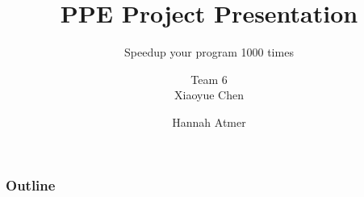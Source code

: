 \documentclass{beamer}
\title{PPE Project Presentation}
\subtitle{Speedup your program 1000 times}
\author{Team 6 \\Xiaoyue Chen \and Hannah Atmer}
\begin{document}
\begin{frame}
  \titlepage
\end{frame}

\begin{frame}
  \frametitle{Outline}
  \tableofcontents
\end{frame}





\end{document}
